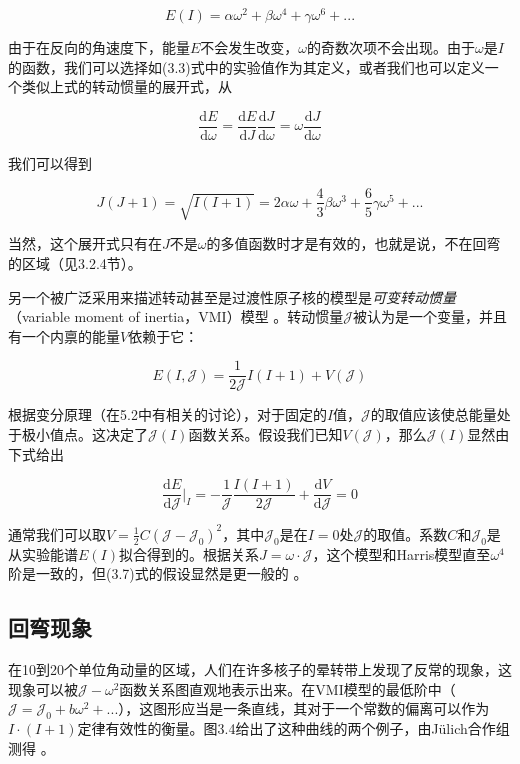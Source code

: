 \begin{equation}
E(I)=\alpha\omega^{2}+\beta\omega^{4}+\gamma\omega^{6}+...
\end{equation}

由于在反向的角速度下，能量$E$不会发生改变，$\omega$的奇数次项不会出现。由于$\omega$是$I$的函数，我们可以选择如(3.3)式中的实验值作为其定义，或者我们也可以定义一个类似上式的转动惯量的展开式，从

\begin{equation}
\frac{\mathrm{d}E}{\mathrm{d}\omega}=\frac{\mathrm{d}E}{\mathrm{d}J}\frac{\mathrm{d}J}{\mathrm{d}\omega}=\omega\frac{\mathrm{d}J}{\mathrm{d}\omega}
\end{equation}

我们可以得到

\[
J(J+1)=\sqrt{I(I+1)}=2\alpha\omega+\frac{4}{3}\beta\omega^{3}+\frac{6}{5}\gamma\omega^{5}+...
\]

当然，这个展开式只有在$J$不是$\omega$的多值函数时才是有效的，也就是说，不在回弯的区域（见3.2.4节）。

另一个被广泛采用来描述转动甚至是过渡性原子核的模型是\emph{可变转动惯量}（variable moment of inertia，VMI）模型
\cite{MSB69,SDG76}。转动惯量$\mathcal{J}$被认为是一个变量，并且有一个内禀的能量$V$依赖于它：

\begin{equation}
E(I,\mathcal{J})=\frac{1}{2\mathcal{J}}I(I+1)+V(\mathcal{J})
\end{equation}

根据变分原理（在5.2中有相关的讨论），对于固定的$I$值，$\mathcal{J}$的取值应该使总能量处于极小值点。这决定了$\mathcal{J}(I)$函数关系。假设我们已知$V(\mathcal{J})$，那么$\mathcal{J}(I)$显然由下式给出

\[
\frac{\mathrm{d}E}{\mathrm{d}\mathcal{J}}\bigg|_{I}=-\frac{1}{\mathcal{J}}\frac{I(I+1)}{2\mathcal{J}}+\frac{\mathrm{d}V}{\mathrm{d}\mathcal{J}}=0
\]

通常我们可以取$V=\frac{1}{2}C(\mathcal{J}-\mathcal{J}_{0})^{2}$，其中$\mathcal{J}_{0}$是在$I=0$处$\mathcal{J}$的取值。系数$C$和$\mathcal{J}_{0}$是从实验能谱$E(I)$拟合得到的。根据关系$J=\omega\cdot\mathcal{J}$，这个模型和Harris模型直至$\omega^{4}$阶是一致的，但(3.7)式的假设显然是更一般的
\cite{DB73,SDG76}。

\subsection{回弯现象}

在10到20个单位角动量的区域，人们在许多核子的晕转带上发现了反常的现象，这现象可以被$\mathcal{J}-\omega^{2}$函数关系图直观地表示出来。在VMI模型的最低阶中（$\mathcal{J}=\mathcal{J}_{0}+b\omega^{2}+...$），这图形应当是一条直线，其对于一个常数的偏离可以作为$I\cdot(I+1)$定律有效性的衡量。图3.4给出了这种曲线的两个例子，由Jülich合作组测得
\cite{LR78}。

